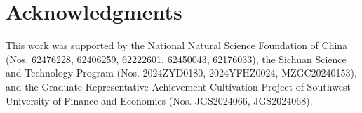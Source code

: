 \documentclass[letterpaper]{article} %
\theoremstyle{definition}
\begin{document}
\section*{Acknowledgments}
This work was supported by the National Natural Science Foundation of China (Nos. 62476228, 62406259, 62222601, 62450043, 62176033), the Sichuan Science and Technology Program (Nos. 2024ZYD0180, 2024YFHZ0024, MZGC20240153), and the Graduate Representative Achievement Cultivation Project of Southwest University of Finance and Economics (Nos. JGS2024066, JGS2024068).

\end{document}
